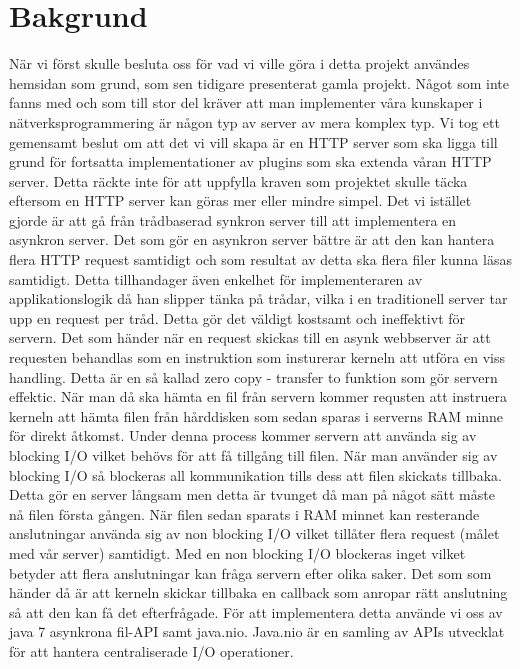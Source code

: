 \section{Bakgrund}

När vi först skulle besluta oss för vad vi ville göra i detta projekt användes hemsidan som grund, som sen tidigare presenterat gamla projekt. Något som inte fanns med och som till stor del kräver att man implementer våra kunskaper i nätverksprogrammering är någon typ av server av mera komplex typ. Vi tog ett gemensamt beslut om att det vi vill skapa är en HTTP server som ska ligga till grund för fortsatta implementationer av plugins som ska extenda våran HTTP server.
Detta räckte inte för att uppfylla kraven som projektet skulle täcka eftersom en HTTP server kan göras mer eller mindre simpel.
Det vi istället gjorde är att gå från trådbaserad synkron server till att implementera en asynkron server.
Det som gör en asynkron server bättre är att den kan hantera flera HTTP request samtidigt och som resultat av detta ska flera filer kunna läsas samtidigt. Detta tillhandager även enkelhet för implementeraren av applikationslogik då han slipper tänka på trådar, vilka i en traditionell server tar upp en request per tråd. Detta gör det väldigt kostsamt och ineffektivt för servern. Det som händer när en request skickas till en asynk webbserver är att requesten behandlas som en instruktion som insturerar kerneln att utföra en viss handling. Detta är en så kallad zero copy - transfer to funktion som gör servern effektic. När man då ska hämta en fil från servern kommer requsten att instruera kerneln att hämta filen från hårddisken som sedan sparas i serverns RAM minne för direkt åtkomst. Under denna process kommer servern att använda sig av blocking I/O vilket behövs för att få tillgång till filen. När man använder sig av blocking I/O så blockeras all kommunikation tills dess att filen skickats tillbaka.
Detta gör en server långsam men detta är tvunget då man på något sätt måste nå filen första gången. När filen sedan sparats i RAM minnet kan resterande anslutningar använda sig av non blocking I/O vilket tillåter flera request (målet med vår server) samtidigt. Med en non blocking I/O blockeras inget vilket betyder att flera anslutningar kan fråga servern efter olika saker. Det som som händer då är att kerneln skickar tillbaka en callback som anropar rätt anslutning så att den kan få det efterfrågade.
För att implementera detta använde vi oss av java 7 asynkrona fil-API samt java.nio. Java.nio är en samling av APIs utvecklat för att hantera centraliserade I/O operationer. 

